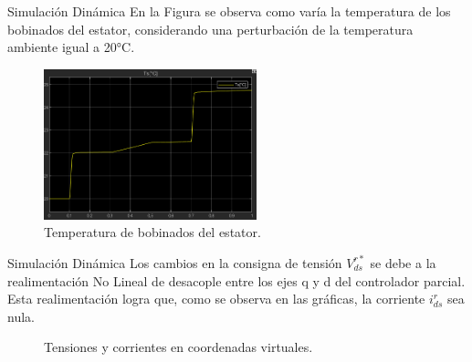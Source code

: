 \documentclass[12pt]{beamer}
\begin{document}
\begin{frame}{Simulación Dinámica}
    En la Figura se observa como varía la temperatura de los bobinados del estator, considerando una perturbación de la temperatura ambiente igual a 20°C.
\begin{figure}[H]
    \centering
    \includegraphics[width=0.55\textwidth]{Imagenes/TemperaturaEstatorDT.png}
    \caption{Temperatura de bobinados del estator.}
    \label{fig:TemperaturaEstatorDT}
\end{figure}
\end{frame}

\begin{frame}{Simulación Dinámica}\scriptsize
Los cambios en la consigna de tensión \(V^{r*}_{ds}\) se debe a la realimentación No Lineal de desacople entre los ejes q y d del controlador parcial. Esta realimentación logra que, como se observa en las gráficas, la corriente \(i^r_{ds}\) sea nula.
\begin{figure}[H]
    \centering
    \caption{Tensiones y corrientes en coordenadas virtuales.}
    \label{fig:ComparacionTensionesCorrientesVirtuales}
\end{figure}
\end{frame}
\end{document}
